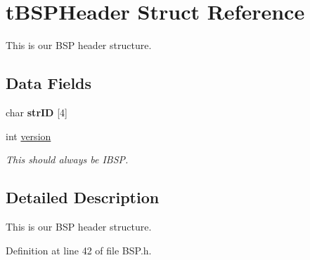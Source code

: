\hypertarget{structt_b_s_p_header}{}\section{t\+B\+S\+P\+Header Struct Reference}
\label{structt_b_s_p_header}


This is our B\+SP header structure.  


\subsection*{Data Fields}
\begin{DoxyCompactItemize}
\item 
char {\bfseries str\+ID} \mbox{[}4\mbox{]}\hypertarget{structt_b_s_p_header_ab24350ee91c9a9a57ae61cee103cbcab}{}\label{structt_b_s_p_header_ab24350ee91c9a9a57ae61cee103cbcab}

\item 
int \hyperlink{structt_b_s_p_header_a251786f33782525889acdb91dc546e0a}{version}\hypertarget{structt_b_s_p_header_a251786f33782525889acdb91dc546e0a}{}\label{structt_b_s_p_header_a251786f33782525889acdb91dc546e0a}

\begin{DoxyCompactList}\small\item\em This should always be \textquotesingle{}I\+B\+SP\textquotesingle{}. \end{DoxyCompactList}\end{DoxyCompactItemize}


\subsection{Detailed Description}
This is our B\+SP header structure. 

Definition at line 42 of file B\+S\+P.\+h.

